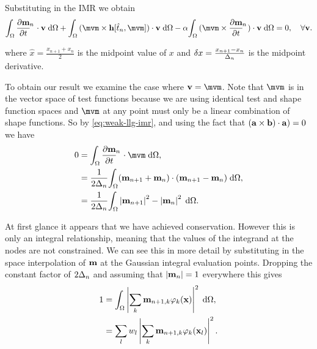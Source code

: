 \newcommand{\midpoint}[1]{\hat{#1}}
\newsubcommand{\mvm}{\midpoint{\mv}}{n}
\newcommand{\tm}{\midpoint{t}_n}

\newcommand{\pdsub}[3]{\mathrlap{\pd{#1\mathrlap{_{#2}}}{#3}}\phantom{\pd{#1_{#2}}{#3}}}
\newcommand{\dtop}{\delta}
\newcommand{\dmdtm}{\pdsub{\mv}{n}{t}}
\newcommand{\dmdtml}{\pdsub{\mv}{n,l}{t}}
\newcommand{\dmdtmj}{\pdsub{\mv}{n,j}{t}}


Substituting in the IMR we obtain
\begin{equation}
  \label{eq:weak-llg-imr}
  \ipg{\dmdtm}{\testv} + \ipg{(\mvm \times \hv[\tm, \mvm])}{\testv} - \dampc \ipg{(\mvm \times \dmdtm)}{\testv} = 0, \quad \forall \testv .
\end{equation}

where $\midpoint{x} = \frac{x_{n+1} + x_{n}}{2}$ is the midpoint value of $x$ and $\dtop x = \frac{x_{n+1} - x_n}{\dtn}$ is the midpoint derivative.

To obtain our result we examine the case where $\testv = \mvm$.
Note that $\mvm$ is in the vector space of test functions because we are using identical test and shape function spaces and $\mvm$ at any point must only be a linear combination of shape functions.
So by \eqref{eq:weak-llg-imr}, and using the fact that $({\mathbf{a}} \times {\mathbf{b}}) \cdot {\mathbf{a}}) = 0$ we have
\begin{equation}
\label{eq:23}
  \begin{aligned}
    0 &= \ipg{\dmdtm}{\mvm}, \\
    &= \frac{1}{2\dtn} \intd{(\mv_{n+1} + \mv_{n}) \cdot (\mv_{n+1} - \mv_n)}, \\
    &= \frac{1}{2\dtn} \intd{\abs{\mv_{n+1}}^2 - \abs{\mv_{n}}^2}.
  \end{aligned}
\end{equation}

At first glance it appears that we have achieved conservation. However this is only an integral relationship, meaning that the values of the integrand at the nodes are not constrained.
We can see this in more detail by substituting in the space interpolation of $\mathbf{m}$ at the Gaussian integral evaluation points.
Dropping the constant factor of $2\Delta_{n}$ and assuming that $\left|{\mathbf{m}_n} \right| = 1$ everywhere this gives
\begin{equation}
  \begin{aligned} 
    1 &= {\int_{\Omega} \left|{\sum_k \mathbf{m}_{n+1, k} \varphi_k(\mathbf{x})} \right|^2 {\; \text{d}} {\Omega}}, \\
    &= \sum_l w_l \left|{\sum_k \mathbf{m}_{n+1, k} \varphi_k(\mathbf{x}_l)} \right|^2.
  \end{aligned} 
\end{equation}

